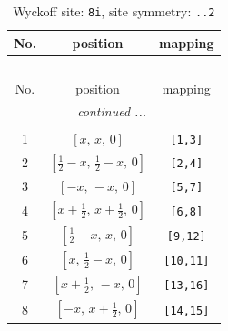 \documentclass[fleqn,8pt]{jsarticle}
\begin{document}
\renewcommand{\arraystretch}{1.2}
\begin{longtable}{ccc}
\caption{Wyckoff site: {\tt 8i}, site symmetry: {\tt ..2}}
 \\
 \hline \hline
No. & position & mapping \\ \hline \endfirsthead

\multicolumn{2}{l}{\tablename\ \thetable{}} \\
 \hline \hline
No. & position & mapping \\ \hline \endhead

 \hline \hline
\multicolumn{2}{r}{\footnotesize\it continued ...} \\ \endfoot

 \hline \hline
\multicolumn{2}{r}{} \\ \endlastfoot

1 & $\left[ x,\, x,\, 0 \right]$ & {\tt [1,3]} \\ \hline
2 & $\left[ \frac{1}{2} - x,\, \frac{1}{2} - x,\, 0 \right]$ & {\tt [2,4]} \\ \hline
3 & $\left[ - x,\, - x,\, 0 \right]$ & {\tt [5,7]} \\ \hline
4 & $\left[ x + \frac{1}{2},\, x + \frac{1}{2},\, 0 \right]$ & {\tt [6,8]} \\ \hline
5 & $\left[ \frac{1}{2} - x,\, x,\, 0 \right]$ & {\tt [9,12]} \\ \hline
6 & $\left[ x,\, \frac{1}{2} - x,\, 0 \right]$ & {\tt [10,11]} \\ \hline
7 & $\left[ x + \frac{1}{2},\, - x,\, 0 \right]$ & {\tt [13,16]} \\ \hline
8 & $\left[ - x,\, x + \frac{1}{2},\, 0 \right]$ & {\tt [14,15]} \\
\end{longtable}
\renewcommand{\arraystretch}{1.2}
\end{document}
